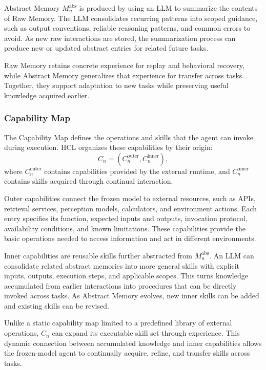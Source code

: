 \documentclass{article}
\begin{document}
Abstract Memory $M_n^{\mathrm{abs}}$ is produced by using an LLM to summarize
the contents of Raw Memory. The LLM consolidates recurring patterns into scoped
guidance, such as output conventions, reliable reasoning patterns, and common
errors to avoid. 
As new raw interactions are
stored, the summarization process can produce new or updated abstract entries
for related future tasks.

Raw Memory retains concrete experience for replay and behavioral recovery,
while Abstract Memory generalizes that experience for transfer across tasks.
Together, they support adaptation to new tasks while preserving useful
knowledge acquired earlier.
\subsubsection{Capability Map}
\label{sec:capability_map}

The Capability Map defines the operations and skills that the agent can invoke
during execution. HCL organizes these capabilities by their origin:
\begin{equation}
\label{eq:capability_map}
C_n
=
\left(
C_n^{\mathrm{outer}},
C_n^{\mathrm{inner}}
\right),
\end{equation}
where $C_n^{\mathrm{outer}}$ contains capabilities provided by the external
runtime, and $C_n^{\mathrm{inner}}$ contains skills acquired through continual
interaction.

Outer capabilities connect the frozen model to external resources, such as
APIs, retrieval services, perception models, calculators, and environment
actions. Each entry specifies its function, expected inputs and outputs,
invocation protocol, availability conditions, and known limitations. These
capabilities provide the basic operations needed to access information and act
in different environments.

Inner capabilities are reusable skills further abstracted from
$M_n^{\mathrm{abs}}$. An LLM can consolidate related abstract memories into
more general skills with explicit inputs, outputs, execution steps, and
applicable scopes. This turns knowledge accumulated from earlier interactions
into procedures that can be directly invoked across tasks. As Abstract Memory
evolves, new inner skills can be added and existing skills can be revised.

Unlike a static capability map limited to a predefined library of external
operations, $C_n$ can expand its executable skill set through experience. This
dynamic connection between accumulated knowledge and inner capabilities allows
the frozen-model agent to continually acquire, refine, and transfer skills
across tasks.
\end{document}
